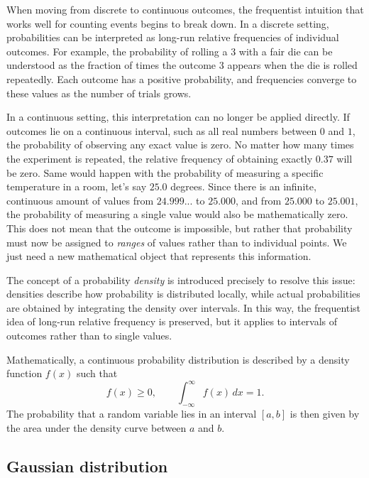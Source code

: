 \medskip

When moving from discrete to continuous outcomes, the frequentist intuition that works well for counting events begins to break down. In a discrete setting, probabilities can be interpreted as long-run relative frequencies of individual outcomes. For example, the probability of rolling a $3$ with a fair die can be understood as the fraction of times the outcome $3$ appears when the die is rolled repeatedly. Each outcome has a positive probability, and frequencies converge to these values as the number of trials grows.

\medskip

In a continuous setting, this interpretation can no longer be applied directly. If outcomes lie on a continuous interval, such as all real numbers between $0$ and $1$, the probability of observing any exact value is zero. No matter how many times the experiment is repeated, the relative frequency of obtaining exactly $0.37$ will be zero. Same would happen with the probability of measuring a specific temperature in a room, let's say $25.0$ degrees. Since there is an infinite, continuous amount of values from $24.999...$ to $25.000$, and from $25.000$ to $25.001$, the probability of measuring a single value would also be mathematically zero. This does not mean that the outcome is impossible, but rather that probability must now be assigned to \textit{ranges} of values rather than to individual points. We just need a new mathematical object that represents this information.

\medskip

The concept of a probability \textit{density} is introduced precisely to resolve this issue: densities describe how probability is distributed locally, while actual probabilities are obtained by integrating the density over intervals. In this way, the frequentist idea of long-run relative frequency is preserved, but it applies to intervals of outcomes rather than to single values.

\medskip

Mathematically, a continuous probability distribution is described by a density function $f(x)$ such that
\begin{equation}
    f(x)\ge 0, \qquad \int_{-\infty}^{\infty} f(x)\,dx = 1.
\end{equation}
The probability that a random variable lies in an interval $[a,b]$ is then given by the area under the density curve between $a$ and $b$.

\subsection{Gaussian distribution}

